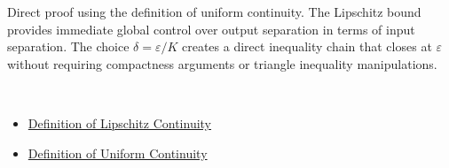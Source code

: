 \begin{remark*}
Direct proof using the definition of uniform continuity. The Lipschitz bound provides immediate global control over output separation in terms of input separation. The choice $\delta = \varepsilon/K$ creates a direct inequality chain that closes at $\varepsilon$ without requiring compactness arguments or triangle inequality manipulations.
\end{remark*}

\begin{remark*}[Dependencies]~\\
\begin{itemize}
  \item \hyperref[def:lipschitz-continuous]{Definition of Lipschitz Continuity}
  \item \hyperref[def:uniform-continuous]{Definition of Uniform Continuity}
\end{itemize}
\end{remark*}
